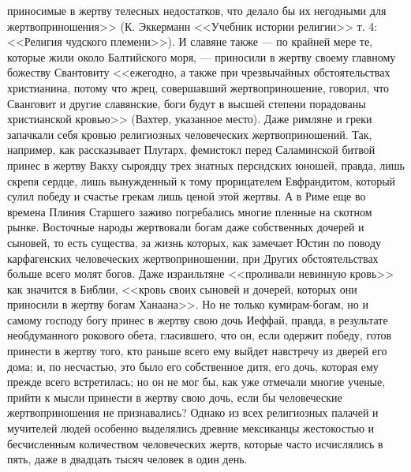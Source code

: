 \documentclass[12pt]{article}
\begin{document}
приносимые в жертву телесных недостатков, что делало бы их негодными для жертвоприношения>> (К. Эккерманн <<Учебник истории религии>>  т. 4: <<Религия чудского племени>>). И славяне также --- по крайней мере те, которые жили около Балтийского моря, --- приносили в жертву своему главному божеству Свантовиту <<ежегодно, а также при чрезвычайных обстоятельствах христианина, потому что жрец, совершавший жертвоприношение, говорил, что Сванговит и другие славянские, боги будут в высшей степени порадованы христианской кровью>> (Вахтер, указанное место). Даже римляне и греки запачкали себя кровью религиозных человеческих жертвоприношений. Так, например, как рассказывает Плутарх, фемистокл перед Саламинской битвой принес в жертву Вакху сыроядцу трех знатных персидских юношей, правда, лишь скрепя сердце, лишь вынужденный к тому прорицателем Евфрандитом, который сулил победу и счастье грекам лишь ценой этой жертвы. А в Риме еще во времена Плиния Старшего заживо погребались многие пленные на скотном рынке. Восточные народы жертвовали богам даже собственных дочерей и сыновей, то есть существа, за жизнь которых, как замечает Юстин по поводу карфагенских человеческих жертвоприношении, при Других обстоятельствах больше всего молят богов. Даже израильтяне <<проливали невинную кровь>>  как значится в Библии, <<кровь своих сыновей и дочерей, которых они приносили в жертву богам Ханаана>>. Но не только кумирам-богам, но и самому господу богу принес в жертву свою дочь Иеффай, правда, в результате необдуманного рокового обета, гласившего, что он, если одержит победу, готов принести в жертву того, кто раньше всего ему выйдет навстречу из дверей его дома; и, по несчастью, это было его собственное дитя, его дочь, которая ему прежде всего встретилась; но он не мог бы, как уже отмечали многие ученые, прийти к мысли принести в жертву свою дочь, если бы человеческие жертвоприношения не признавались? Однако из всех религиозных палачей и мучителей людей особенно выделялись древние мексиканцы жестокостью и бесчисленным количеством человеческих жертв, которые часто исчислялись в пять, даже в двадцать тысяч человек в один день. 
\end{document}
